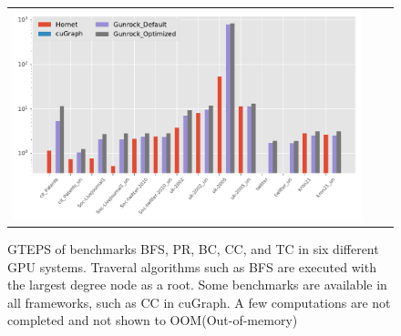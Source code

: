 \begin{figure}
\begin{tabular}{@{}c@{ }c@{ }c@{ }}
\includegraphics[width=.45\linewidth]{plots/log_GTEPS_G_BC_VS32.pdf}\\[-1ex]
\end{tabular}
\caption{GTEPS of benchmarks BFS, PR, BC, CC, and TC in six different GPU systems. Traveral algorithms such as BFS are executed with the largest degree node as a root. Some benchmarks are available in all frameworks, such as CC in cuGraph. A few computations are not completed and not shown to OOM(Out-of-memory)}%
\label{fig:GTEPS_ALL}
\end{figure}

